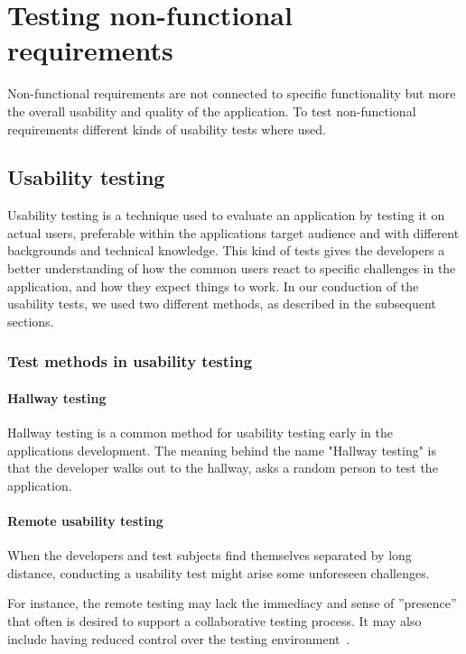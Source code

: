 \section{Testing non-functional requirements}
\label{sec:testingnonfunctionalrequirements}
Non-functional requirements are not connected to specific functionality but more the overall usability and quality of the application. To test non-functional requirements different kinds of usability tests where used.

\subsection{Usability testing}
\label{sec:userTest}

Usability testing is a technique used to evaluate an application by testing it on actual users, preferable within the applications target audience and with different backgrounds and technical knowledge. This kind of tests gives the developers a better understanding of how the common users react to specific challenges in the application, and how they expect things to work.
In our conduction of the usability tests, we used two different methods, as described in the subsequent sections.

\subsubsection{Test methods in usability testing}

\paragraph{Hallway testing}
Hallway testing is a common method for usability testing early in the applications development. The meaning behind the name "Hallway testing" is that the developer walks out to the hallway, asks a random person to test the application. 

\paragraph{Remote usability testing}
When the developers and test subjects find themselves separated by long distance, conducting a usability test might arise some unforeseen challenges.

For instance, the remote testing may lack the immediacy and sense of ''presence'' that often is desired to support a collaborative testing process. It may also include having reduced control over the testing environment~\cite{remoteTest}. 

